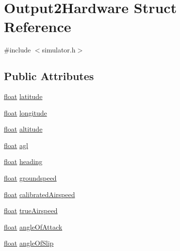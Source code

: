 \hypertarget{struct_output2_hardware}{\section{Output2\-Hardware Struct Reference}
\label{struct_output2_hardware}
}


{\ttfamily \#include $<$simulator.\-h$>$}

\subsection*{Public Attributes}
\begin{DoxyCompactItemize}
\item 
\hyperlink{_super_l_u_support_8h_a6a1bb6ed41f44b60e7bd83b0e9945aa7}{float} \hyperlink{group___h_i_t_l_plugin_ga3f453b19b12f4264ebffe76a1e8ee93d}{latitude}
\item 
\hyperlink{_super_l_u_support_8h_a6a1bb6ed41f44b60e7bd83b0e9945aa7}{float} \hyperlink{group___h_i_t_l_plugin_gacf92ed715333315d33a77f42aa1ed71e}{longitude}
\item 
\hyperlink{_super_l_u_support_8h_a6a1bb6ed41f44b60e7bd83b0e9945aa7}{float} \hyperlink{group___h_i_t_l_plugin_gafbb52a0b15f16cac6f1efbcae3702e96}{altitude}
\item 
\hyperlink{_super_l_u_support_8h_a6a1bb6ed41f44b60e7bd83b0e9945aa7}{float} \hyperlink{group___h_i_t_l_plugin_ga40e8c62b6079618b6541408ce3dafe0c}{agl}
\item 
\hyperlink{_super_l_u_support_8h_a6a1bb6ed41f44b60e7bd83b0e9945aa7}{float} \hyperlink{group___h_i_t_l_plugin_ga061c55e7f046212595dae9123b2589d8}{heading}
\item 
\hyperlink{_super_l_u_support_8h_a6a1bb6ed41f44b60e7bd83b0e9945aa7}{float} \hyperlink{group___h_i_t_l_plugin_ga6cab485f36b93a2e86e248bcc6b240f1}{groundspeed}
\item 
\hyperlink{_super_l_u_support_8h_a6a1bb6ed41f44b60e7bd83b0e9945aa7}{float} \hyperlink{group___h_i_t_l_plugin_gaa6ec37dae61764737236528ba5a2445c}{calibrated\-Airspeed}
\item 
\hyperlink{_super_l_u_support_8h_a6a1bb6ed41f44b60e7bd83b0e9945aa7}{float} \hyperlink{group___h_i_t_l_plugin_gaca71e282fd00490c801905254e99ef54}{true\-Airspeed}
\item 
\hyperlink{_super_l_u_support_8h_a6a1bb6ed41f44b60e7bd83b0e9945aa7}{float} \hyperlink{group___h_i_t_l_plugin_gaa698baa5c5eb08252558e7821e3d48dd}{angle\-Of\-Attack}
\item 
\hyperlink{_super_l_u_support_8h_a6a1bb6ed41f44b60e7bd83b0e9945aa7}{float} \hyperlink{group___h_i_t_l_plugin_ga03a3c3371749ca83551e6f29e804a205}{angle\-Of\-Slip}

\end{DoxyCompactItemize}
